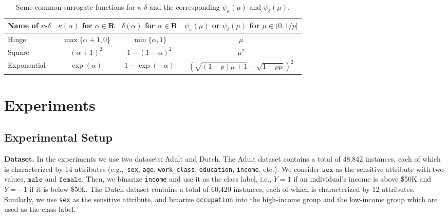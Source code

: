 \documentclass[letterpaper]{article} %
\def\eg{e.g.,~}                %
\begin{document}
\begin{table}[ht]%
	\centering
	\renewcommand{\arraystretch}{1.6}
	\begin{tabular}{|l|c|c|c|}
		\hline
		Name of $\kappa\text{-}\delta$ & $\kappa( \alpha)$ for $\alpha \in \textbf{R}$ & $\delta( \alpha)$ for $\alpha \in \textbf{R}$ & $\psi_{\kappa} (\mu)$ or $\psi_{\delta} (\mu)$ for $\mu \in (0, 1/p]$ \\ \hline
		Hinge                          & $\max \{ \alpha + 1, 0 \}$                    & $\min \{ \alpha, 1 \}$                        & $\mu $                                                              \\
		Square                         & $(\alpha + 1 )^2 $                            & $1 - (1 - \alpha )^2 $                        & $\mu^2$                                                             \\
		Exponential                    & $\exp(\alpha) $                               & $1 - \exp(-\alpha) $                          & $(\sqrt{(1-p)\mu+1} - \sqrt{1-p \mu} )^2$                                             \\ \hline
	\end{tabular}
	\caption{Some common surrogate functions for $\kappa \text{-} \delta$ and the corresponding $\psi_{\kappa} (\mu)$ and $\psi_{\delta} (\mu)$.}
	\label{tab:surrogate_functions}
\end{table}

\section{Experiments}\label{sec:e}
\subsection{Experimental Setup}
{\bf Dataset.} In the experiments we use two datasets: Adult and Dutch. The Adult dataset \cite{Lichman2013} contains a total of 48,842 instances, each of which is characterized by 14 attributes (\eg \texttt{sex}, \texttt{age}, \texttt{work\_class}, \texttt{education}, \texttt{income}, etc.). We consider $\texttt{sex}$ as the sensitive attribute with two values, $\texttt{male}$ and $\texttt{female}$. Then, we binarize \texttt{income} and use it as the class label, i.e., $Y=1$ if an individual's income is above \$50K and $Y=-1$ if it is below \$50k. The Dutch dataset \cite{Zliobaite2011} contains a total of 60,420 instances, each of which is characterized by 12 attributes. Similarly, we use \texttt{sex} as the sensitive attribute, and binarize \texttt{occupation} into the high-income group and the low-income group which are used as the class label.
\end{document}
